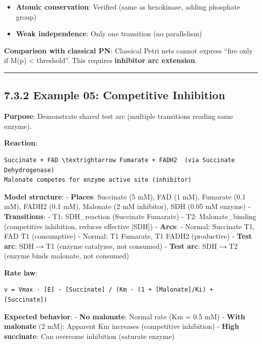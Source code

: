 \begin{itemize}
\item
  \checkmark \textbf{Atomic conservation}: Verified (same as hexokinase, adding
  phosphate group)
\item
  \textwarning \textbf{Weak independence}: Only one transition (no parallelism)
\end{itemize}

\textbf{Comparison with classical PN}: Classical Petri nets cannot
express ``fire only if M(p) \textless{} threshold''. This requires
\textbf{inhibitor arc extension}.

\begin{center}\rule{0.5\linewidth}{0.5pt}\end{center}

\hypertarget{example-05-competitive-inhibition}{%
\subsection{7.3.2 Example 05: Competitive
Inhibition}\label{example-05-competitive-inhibition}}

\textbf{Purpose}: Demonstrate shared test arc (multiple transitions
reading same enzyme).

\textbf{Reaction}:

\begin{lstlisting}
Succinate + FAD \textrightarrow Fumarate + FADH2  (via Succinate Dehydrogenase)
Malonate competes for enzyme active site (inhibitor)
\end{lstlisting}

\textbf{Model structure}: - \textbf{Places}: Succinate (5 mM), FAD (1
mM), Fumarate (0.1 mM), FADH2 (0.1 mM), Malonate (2 mM inhibitor), SDH
(0.05 mM enzyme) - \textbf{Transitions}: - T1: SDH\_reaction (Succinate
\textrightarrow Fumarate) - T2: Malonate\_binding (competitive inhibition, reduces
effective {[}SDH{]}) - \textbf{Arcs}: - Normal: Succinate \textrightarrow T1, FAD \textrightarrow T1
(consumptive) - Normal: T1 \textrightarrow Fumarate, T1 \textrightarrow FADH2 (productive) -
\textbf{Test arc}: SDH ⤏ T1 (enzyme catalyzes, not consumed) -
\textbf{Test arc}: SDH ⤏ T2 (enzyme binds malonate, not consumed)

\textbf{Rate law}:

\begin{lstlisting}
v = Vmax · [E] · [Succinate] / (Km · (1 + [Malonate]/Ki) + [Succinate])
\end{lstlisting}

\textbf{Expected behavior}: - \textbf{No malonate}: Normal rate (Km =
0.5 mM) - \textbf{With malonate} (2 mM): Apparent Km increases
(competitive inhibition) - \textbf{High succinate}: Can overcome
inhibition (saturate enzyme)

